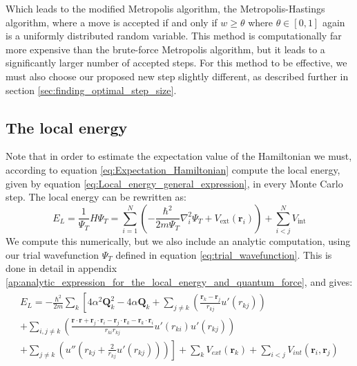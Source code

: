 \documentclass[a4paper, 10pt]{article}
\begin{document}
	Which leads to the modified Metropolis algorithm, the Metropolis-Hastings algorithm, where a move is accepted if and only if $w\geq \theta$ where $\theta\in [0,1]$ again is a uniformly distributed random variable. This method is computationally far more expensive than the brute-force Metropolis algorithm, but it leads to a  significantly larger number of accepted steps. For this method to be effective, we must also choose our proposed new step slightly different, as described further in section \ref{sec:finding_optimal_step_size}.
	\subsection{The local energy}
	Note that in  order to estimate the expectation value of the Hamiltonian we must, according to equation \ref{eq:Expectation_Hamiltonian} compute the local energy, given by equation \ref{eq:Local_energy_general_expression}, in every Monte Carlo step. The local energy can be rewritten as:
	\begin{equation}
	E_L=\frac{1}{\Psi_T}H\Psi_T =\sum_{i=1}^N\left(-\frac{\hbar^2}{2m\Psi_T}\nabla_i^2 \Psi_T+V_{\mathrm{ext}}(\boldsymbol{r}_i)\right)+\sum_{i<j}^N V_{\mathrm{int}}
	\end{equation}
	We compute this numerically, but we also include an analytic computation, using our trial wavefunction $\Psi_T$ defined in equation \ref{eq:trial_wavefunction}. This is done in detail in appendix \ref{ap:analytic_expression_for_the_local_energy_and_quantum_force}, and gives:
	\begin{align}\label{eq:Local_energy_all}
	\begin{split}
	E_{L} = -\frac{\hbar^{2}}{2m}\sum_{k}\left[
	4\alpha^{2}\boldsymbol{Q}_{k}^{2} - 4\alpha\boldsymbol{Q}_{k} + \sum_{j \neq k}\left(\frac{\boldsymbol{r}_{k} - \boldsymbol{r}_{j}}{r_{kj}}u'(r_{kj})\right)\right.
	\\ \left. + \sum_{i,j \neq k}\left(\frac{\boldsymbol{r}\cdot\boldsymbol{r} + \boldsymbol{r}_{j}\cdot\boldsymbol{r}_{i} - \boldsymbol{r}_{j}\cdot\boldsymbol{r}_{k} -\boldsymbol{r}_{k}\cdot\boldsymbol{r}_{i}}{r_{ki}r_{kj}}u'(r_{ki})u'(r_{kj})\right)\right.
	\\
	\left. + \sum_{j \neq k}\left(u''(r_{kj} + \frac{2}{r_{kj}}u'(r_{kj}))\right)\right]
	+ \sum_{k}V_{ext}(\boldsymbol{r}_{k}) + \sum_{i < j}V_{int}(\boldsymbol{r}_{i}, \boldsymbol{r}_{j})
	\end{split}
	\end{align}
\end{document}

